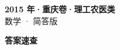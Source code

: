 \documentclass[zihao=-4, a4paper]{ctexart}
\begin{document}
\begin{center}
  {\Large\bfseries 2015 年·重庆卷·理工农医类}\\[4pt]
  {\large 数学 · 简答版}
\end{center}
\medskip
{}

\clearpage
{}
\begin{center}{\Large\bfseries 答案速查}\end{center}
\medskip

\end{document}
